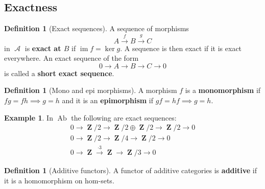 \documentclass[10pt,]{book}
\newcommand{\terminology}[1]{\textbf{#1}}
\theoremstyle{plain}
\theoremstyle{definition}
\newtheorem{definition}[theorem]{Definition}
\newtheorem{example}[theorem]{Example}
\numberwithin{equation}{section}
\DeclareMathOperator{\im}{im}
\DeclareMathOperator{\Ab}{\text{Ab}}
\DeclareMathOperator{\cA}{\mathcal{A}}
\DeclareMathOperator{\ZZ}{\mathbf{Z}}
\begin{document}
\subsection[Exactness]{Exactness}\label{sec-exactness}
\begin{definition}[Exact sequences]\label{definition-3}
A sequence of morphisms \[A\xrightarrow{f} B \xrightarrow{g}C\] in \(\cA\) is \terminology{exact at \(B\)} if \(\im f = \ker g\).
              A sequence is then exact if it is exact everywhere.
              An exact sequence of the form \[0\to A \to B \to C \to 0\] is called a \terminology{short exact sequence}.
            \end{definition}
\begin{definition}[Mono and epi morphisms]\label{definition-4}
A morphism \(f\) is a \terminology{monomorphism} if \(fg = fh \implies g=h\) and it is an \terminology{epimorphism} if \(gf = hf \implies g=h\).\end{definition}
\begin{example}\label{example-4}
In \(\Ab\) the following are exact sequences:
              \begin{gather*}
0\to \ZZ/2 \to \ZZ/2 \oplus \ZZ/2 \to \ZZ/2 \to 0\\
0\to \ZZ/2 \to \ZZ/4\to \ZZ/2 \to 0\\
0\to \ZZ \xrightarrow{\cdot 3} \ZZ\to \ZZ/3 \to 0
\end{gather*}\end{example}
\begin{definition}[Additive functors]\label{definition-5}
A functor of additive categories is \terminology{additive} if it is a homomorphism on hom-sets.\end{definition}
\typeout{************************************************}
\typeout{************************************************}
\end{document}
